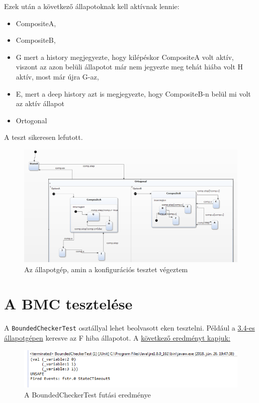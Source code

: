 Ezek után a következő állapotoknak kell aktívnak lennie:
\begin{itemize}
	\item CompositeA,
	\item CompositeB,
	\item G mert a history megjegyezte, hogy kilépéskor CompositeA volt aktív, viszont az azon belüli állapotot már nem jegyezte meg tehát hiába volt H aktív, most már újra G-az,
	\item E, mert a deep history azt is megjegyezte, hogy CompositeB-n belül mi volt az aktív állapot
	\item Ortogonal
\end{itemize}

A teszt sikeresen lefutott.

\begin{figure}[!ht]
	\centering
	\includegraphics[width=150mm, keepaspectratio]{figures/komplex.png}
	\caption{Az állapotgép, amin a konfigurációs tesztet végeztem}
	\label{fig:configexample}
\end{figure}

\section{A BMC tesztelése}
A \verb+BoundedCheckerTest+ osztállyal lehet beolvasott {\thetaSc}eken tesztelni. Például a \hyperref[fig:serializeexample]{3.4-es állapotgépen} keresve az F hiba állapotot. A \hyperref[fig:bmcresult]{következő eredményt kapjuk:} 

\begin{figure}[!ht]
	\centering
	\includegraphics[width=150mm, keepaspectratio]{figures/bmcresult.png}
	\caption{A BoundedCheckerTest futási eredménye}
	\label{fig:bmcresult}
\end{figure}

